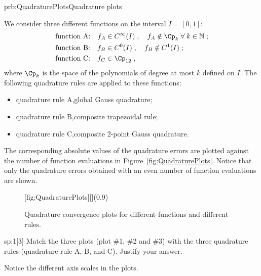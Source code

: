 
\begin{samproblem}{prb:QuadraturePlots}{Quadrature plots}{
  We consider three different functions on the interval $I=[0,1]$:
  \begin{align*}
    \text{function A:}\quad f_A&\in C^\infty(I)\;,\quad f_A\notin\Cp_k\; \forall\;k\in\mathbb{N}\;;\\
    \text{function B:}\quad f_B&\in C^0(I)\;,\quad f_B\notin C^1(I)\;;\\
    \text{function C:}\quad f_C&\in\Cp_{12}\;,
  \end{align*}
  where $\Cp_k$ is the space of the polynomials of degree at most $k$ defined on $I$.
  The following quadrature rules are applied to these functions:
  \begin{itemize}
    \item quadrature rule A,\quad global Gauss quadrature;
    \item quadrature rule B,\quad composite trapezoidal rule;
    \item quadrature rule C,\quad composite 2-point Gauss quadrature.
  \end{itemize}
  The corresponding absolute values of the quadrature errors are plotted against the number of function evaluations in Figure~\ref{fig:QuadraturePlots}.
  Notice that only the quadrature errors obtained with an even number of function evaluations are shown.
}

  \begin{figure}[hbt]
    \centering
    \hspace{8mm}
    [fig:QuadraturePlots][](0.9\textwidth)
    \caption{Quadrature convergence plots for different functions and different rules.}
  \end{figure}


\begin{subproblem}{sp:1}[3] 
  Match the three plots (plot \#1, \#2 and \#3) with the three quadrature rules (quadrature rule A, B, and  C). Justify your answer.\\[1.5ex]
  \begin{samhint}
    Notice the different axis scales in the plots.
  \end{samhint}


\end{subproblem}
\end{samproblem}
